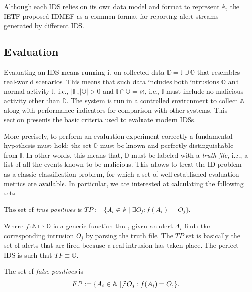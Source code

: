 Although each \ac{IDS} relies on its own data model and format to
represent $\mathbb{A}$, the \ac{IETF} proposed \ac{IDMEF}
\citep{IDMEF} as a common format for reporting alert streams generated
by different \ac{IDS}.

\subsection{Evaluation}
\label{detection:evaluation} Evaluating an \ac{IDS} means running it
on collected data $\mathbb{D} = \mathbb{I} \cup \mathbb{O}$ that
resembles real-world scenarios. This means that such data includes
both intrusions $\mathbb{O}$ and normal activity $\mathbb{I}$, i.e.,
$|\mathbb{I}|, |\mathbb{O}| > 0$ and $\mathbb{I} \cap \mathbb{O} =
\varnothing$, i.e., $\mathbb{I}$ must include no malicious activity
other than $\mathbb{O}$.  The system is run in a controlled
environment to collect $\mathbb{A}$ along with performance indicators
for comparison with other systems. This section presents the basic
criteria used to evaluate modern \acp{IDS}.

More precisely, to perform an evaluation experiment correctly a
fundamental hypothesis must hold: the set $\mathbb{O}$ must be known
and perfectly distinguishable from $\mathbb{I}$. In other words, this
means that, $\mathbb{D}$ must be labeled with a \emph{truth file},
i.e., a list of all the events known to be malicious. This allows to
treat the \ac{ID} problem as a classic classification problem, for
which a set of well-established evaluation metrics are available. In
particular, we are interested at calculating the following sets.

\begin{definition}
  The set of \emph{true positives} is $TP := \{A_{i} \in \mathbb{A}
  \mid \exists O_{j}: f(A_{i}) = O_{j}\}$.
\end{definition}

\noindent Where $f: \mathbb{A} \mapsto \mathbb{O}$ is a generic
function that, given an alert $A_{i}$ finds the corresponding
intrusion $O_{j}$ by parsing the truth file. The $TP$ set is basically
the set of alerts that are fired because a real intrusion has taken
place. The perfect \ac{IDS} is such that $TP \equiv \mathbb{O}$.

\begin{definition}
  The set of \emph{false positives} is
  \begin{displaymath}
    FP := \{A_{i} \in \mathbb{A} \mid \not\exists O_{j}: f(A_{i}) =
    O_{j}\}.
  \end{displaymath}
\end{definition}


